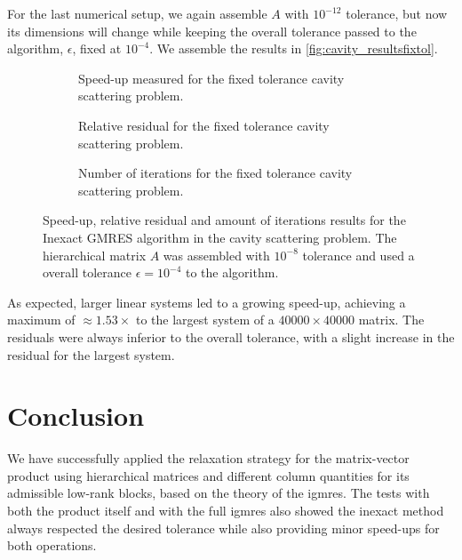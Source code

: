 For the last numerical setup, we again assemble $A$ with $10^{-12}$ tolerance, but now its dimensions will change while keeping the overall tolerance passed to the algorithm, $\epsilon$, fixed at $10^{-4}$. We assemble the results in \autoref{fig:cavity_resultsfixtol}.

\begin{figure}[h!]
    \centering
    \begin{subfigure}[b]{0.6\linewidth}
        
        \caption{Speed-up measured for the fixed tolerance cavity scattering problem.}
    \end{subfigure}
    \begin{subfigure}[b]{0.4\linewidth}
        
        \caption{Relative residual for the fixed tolerance cavity scattering problem.}
    \end{subfigure}
    \begin{subfigure}[b]{0.4\linewidth}
        
        \caption{Number of iterations for the fixed tolerance cavity scattering problem.}
    \end{subfigure}
    \caption{Speed-up, relative residual and amount of iterations results for the Inexact GMRES algorithm in the cavity scattering problem. The hierarchical matrix $A$ was assembled with $10^{-8}$ tolerance and used a overall tolerance $\epsilon = 10^{-4}$ to the algorithm.}
    \label{fig:cavity_resultsfixtol}
\end{figure}

As expected, larger linear systems led to a growing speed-up, achieving a maximum of $\approx 1.53\times$ to the largest system of a $40000 \times 40000$ matrix. The residuals were always inferior to the overall tolerance, with a slight increase in the residual for the largest system.

\clearpage
\section{Conclusion}

We have successfully applied the relaxation strategy for the matrix-vector product using hierarchical matrices and different column quantities for its admissible low-rank blocks, based on the theory of the \acrfull{igmres}. The tests with both the product itself and with the full \acrshort{igmres} also showed the inexact method always respected the desired tolerance while also providing minor speed-ups for both operations.

